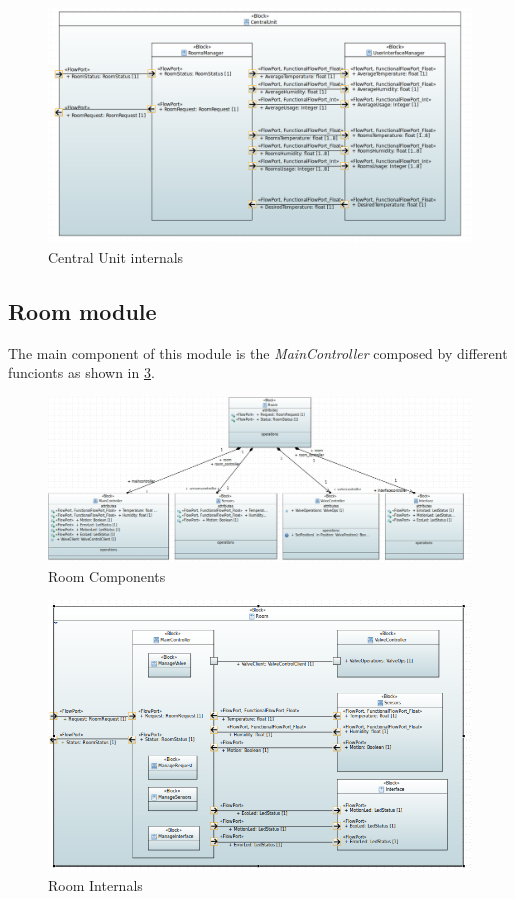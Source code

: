 \begin{figure}[H]
	\centering
	\includegraphics[width=12cm,keepaspectratio]{img/sysml/CentralUnitInternals}
	\caption{Central Unit internals}
	\label{fig:CentralUnit_internals}
\end{figure}


\subsection{Room module}
The main component of this module is the \textit{MainController} composed by different funcionts as shown in \ref{fig:RoomInternals}.
\begin{figure}[H]
	\centering
	\includegraphics[width=13cm,keepaspectratio]{img/sysml/RoomComponents}
	\caption{Room Components}
	\label{fig:RoomComponents}
\end{figure}

\begin{figure}[H]
	\centering
	\includegraphics[width=13cm,keepaspectratio]{img/sysml/RoomInternals}
	\caption{Room Internals}
	\label{fig:RoomInternals}
\end{figure}

